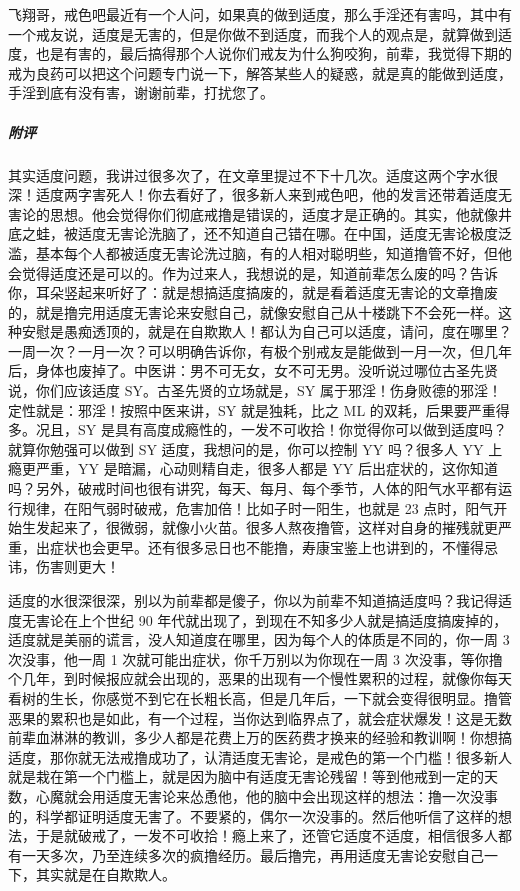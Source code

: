 \begin{case}
    飞翔哥，戒色吧最近有一个人问，如果真的做到适度，那么手淫还有害吗，其中有一个戒友说，适度是无害的，但是你做不到适度，而我个人的观点是，就算做到适度，也是有害的，最后搞得那个人说你们戒友为什么狗咬狗，前辈，我觉得下期的戒为良药可以把这个问题专门说一下，解答某些人的疑惑，就是真的能做到适度，手淫到底有没有害，谢谢前辈，打扰您了。
    \subparagraph{附评} 其实适度问题，我讲过很多次了，在文章里提过不下十几次。适度这两个字水很深！适度两字害死人！你去看好了，很多新人来到戒色吧，他的发言还带着适度无害论的思想。他会觉得你们彻底戒撸是错误的，适度才是正确的。其实，他就像井底之蛙，被适度无害论洗脑了，还不知道自己错在哪。在中国，适度无害论极度泛滥，基本每个人都被适度无害论洗过脑，有的人相对聪明些，知道撸管不好，但他会觉得适度还是可以的。作为过来人，我想说的是，知道前辈怎么废的吗？告诉你，耳朵竖起来听好了：就是想搞适度搞废的，就是看着适度无害论的文章撸废的，就是撸完用适度无害论来安慰自己，就像安慰自己从十楼跳下不会死一样。这种安慰是愚痴透顶的，就是在自欺欺人！都认为自己可以适度，请问，度在哪里？一周一次？一月一次？可以明确告诉你，有极个别戒友是能做到一月一次，但几年后，身体也废掉了。中医讲：男不可无女，女不可无男。没听说过哪位古圣先贤说，你们应该适度 SY。古圣先贤的立场就是，SY 属于邪淫！伤身败德的邪淫！定性就是：邪淫！按照中医来讲，SY 就是独耗，比之 ML 的双耗，后果要严重得多。况且，SY 是具有高度成瘾性的，一发不可收拾！你觉得你可以做到适度吗？就算你勉强可以做到 SY 适度，我想问的是，你可以控制 YY 吗？很多人 YY 上瘾更严重，YY 是暗漏，心动则精自走，很多人都是 YY 后出症状的，这你知道吗？另外，破戒时间也很有讲究，每天、每月、每个季节，人体的阳气水平都有运行规律，在阳气弱时破戒，危害加倍！比如子时一阳生，也就是 23 点时，阳气开始生发起来了，很微弱，就像小火苗。很多人熬夜撸管，这样对自身的摧残就更严重，出症状也会更早。还有很多忌日也不能撸，寿康宝鉴上也讲到的，不懂得忌讳，伤害则更大！

    适度的水很深很深，别以为前辈都是傻子，你以为前辈不知道搞适度吗？我记得适度无害论在上个世纪 90 年代就出现了，到现在不知多少人就是搞适度搞废掉的，适度就是美丽的谎言，没人知道度在哪里，因为每个人的体质是不同的，你一周 3 次没事，他一周 1 次就可能出症状，你千万别以为你现在一周 3 次没事，等你撸个几年，到时候报应就会出现的，恶果的出现有一个慢性累积的过程，就像你每天看树的生长，你感觉不到它在长粗长高，但是几年后，一下就会变得很明显。撸管恶果的累积也是如此，有一个过程，当你达到临界点了，就会症状爆发！这是无数前辈血淋淋的教训，多少人都是花费上万的医药费才换来的经验和教训啊！你想搞适度，那你就无法戒撸成功了，认清适度无害论，是戒色的第一个门槛！很多新人就是栽在第一个门槛上，就是因为脑中有适度无害论残留！等到他戒到一定的天数，心魔就会用适度无害论来怂恿他，他的脑中会出现这样的想法：撸一次没事的，科学都证明适度无害了。不要紧的，偶尔一次没事的。然后他听信了这样的想法，于是就破戒了，一发不可收拾！瘾上来了，还管它适度不适度，相信很多人都有一天多次，乃至连续多次的疯撸经历。最后撸完，再用适度无害论安慰自己一下，其实就是在自欺欺人。


\end{case}
